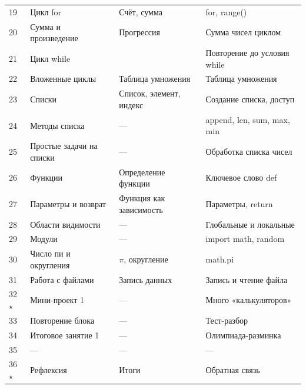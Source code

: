 \documentclass[12pt,a4paper]{article}
\newcommand{\ml}[1]{\textcolor{blue!65!black}{\small #1}}
\begin{document}
\begin{longtable}{C{0.9cm}L{4.3cm}L{4.1cm}L{4.5cm}}
19 & Цикл for & Счёт, сумма & \ml{for, range()}\\
20 & Сумма и произведение & Прогрессия & \ml{Сумма чисел циклом}\\
21 & Цикл while & & Повторение до условия  \ml{while}\\
22 & Вложенные циклы & Таблица умножения & \ml{Таблица умножения}\\
23 & Списки & Список, элемент, индекс & \ml{Создание списка, доступ}\\
24 & Методы списка & --- & \ml{append, len, sum, max, min}\\
25 & Простые задачи на списки & --- & \ml{Обработка списка чисел}\\
26 & Функции & Определение функции & \ml{Ключевое слово def}\\
27 & Параметры и возврат & Функция как зависимость & \ml{Параметры, return}\\
28 & Области видимости & --- & \ml{Глобальные и локальные}\\
29 & Модули & --- & \ml{import math, random}\\
30 & Число пи и округления & $\pi$, округление & \ml{math.pi}\\
31 & Работа с файлами & Запись данных & \ml{Запись и чтение файла}\\
32 $\star$ & Мини-проект 1 & --- & Много «калькуляторов»\\
33 & Повторение блока & --- & Тест-разбор\\
34 & Итоговое занятие 1 & --- & Олимпиада-разминка\\
35 & --- & --- & ---\\
36 $\star$ & Рефлексия & Итоги & Обратная связь\\
\midrule


\end{longtable}
\end{document}
